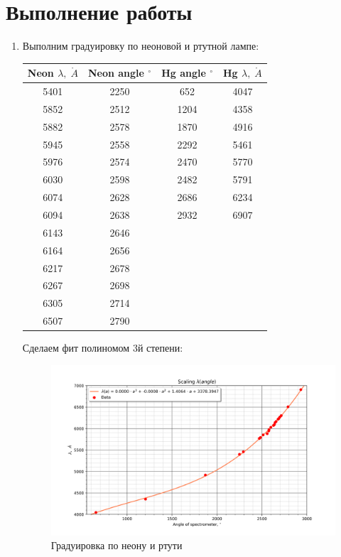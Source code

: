 \documentclass[a4paper]{article}
\begin{document}
\section{Выполнение работы}
\begin{enumerate}
    \item Выполним градуировку по неоновой и ртутной лампе:
    
    \begin{table}[H]
        \centering
        \begin{tabular}{|c|c|c|c|}
            \hline
            Neon $\lambda, \; \mathring{A}$ & Neon angle $^{\circ}$ &  Hg angle $^{\circ}$&Hg $\lambda, \; \mathring{A}$  \\
            \hline
            5401 & 2250 & 652 & 4047 \\ \hline
            5852 & 2512 & 1204 & 4358 \\\hline
            5882 & 2578 & 1870 & 4916 \\\hline
            5945 & 2558 & 2292 & 5461 \\\hline
            5976 & 2574 & 2470 & 5770 \\\hline
            6030 & 2598 & 2482 & 5791 \\\hline
            6074 & 2628 & 2686 & 6234 \\\hline
            6094 & 2638 & 2932 & 6907 \\\hline
            6143 & 2646 &  &  \\\hline
            6164 & 2656 &  &  \\\hline
            6217 & 2678 &  &  \\\hline
            6267 & 2698 &  &  \\\hline
            6305 & 2714 &  &  \\\hline
            6507 & 2790 &  &  \\\hline
        \end{tabular}
    \end{table}

    Сделаем фит полиномом 3й степени:

    \begin{figure}[H]
        \begin{center}
        \includegraphics[scale = 0.6]{Scale.png}
        \caption{Градуировка по неону и ртути}
        \label{Neon}
        \end{center}
    \end{figure}


\end{enumerate}
\end{document}
